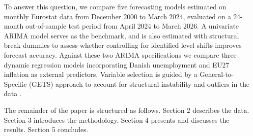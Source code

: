 To answer this question, we compare five forecasting models estimated on 
monthly Eurostat data from December 2000 to March 2024, evaluated on a 
24-month out-of-sample test period from April 2024 to March 2026. A univariate 
ARIMA model serves as the benchmark, and is also estimated with structural break 
dummies to assess whether controlling for identified level shifts improves forecast 
accuracy. Against these two ARIMA specifications we compare three dynamic 
regression models incorporating Danish unemployment and EU27 inflation as 
external predictors. Variable selection is guided by a General-to-Specific (GETS) approach to 
account for structural instability and outliers in the data 
\parencite{doornik2014}. 



The remainder of the paper is structured as follows. Section 2 describes the 
data. Section 3 introduces the methodology. Section 4 presents and discusses 
the results. Section 5 concludes.